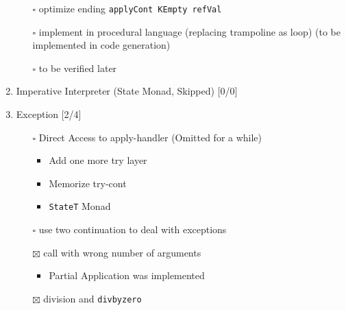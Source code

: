 \documentclass[11pt]{article}
\begin{document}
\begin{enumerate}
\begin{enumerate}
\item[{$\square$}] optimize ending \texttt{applyCont KEmpty refVal}
\item[{$\square$}] implement in procedural language (replacing trampoline as loop) (to
be implemented in code generation)
\item[{$\square$}] to be verified later
\end{enumerate}
\item Imperative Interpreter (State Monad, Skipped) [0/0]
\item Exception [2/4]
\begin{enumerate}
\setcounter{enumii}{34}
\item[{$\square$}] Direct Access to apply-handler (Omitted for a while)
\begin{itemize}
\item Add one more try layer
\item Memorize try-cont
\item \texttt{StateT} Monad
\end{itemize}
\item[{$\square$}] use two continuation to deal with exceptions
\item[{$\boxtimes$}] call with wrong number of arguments
\begin{itemize}
\item Partial Application was implemented
\end{itemize}
\item[{$\boxtimes$}] division and \texttt{divbyzero}
\end{enumerate}
\end{enumerate}
\end{document}
